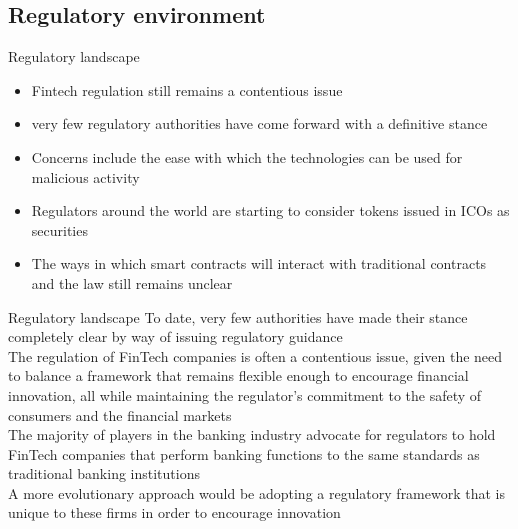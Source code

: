\documentclass[10pt]{beamer}
\begin{document}

\subsection{Regulatory environment}

\begin{frame}{Regulatory landscape}
	\begin{itemize}
		\item Fintech regulation still remains a contentious issue
		\item very few regulatory authorities have come forward with a definitive stance
		\item Concerns include the ease with which the technologies can be used for malicious activity
		\item Regulators around the world are starting to consider tokens issued in ICOs as securities
		\item The ways in which smart contracts will interact with traditional contracts and the law still remains unclear
	\end{itemize}
\end{frame}



\begin{frame}{Regulatory landscape}
	To date, very few authorities have made their stance completely clear by way of issuing regulatory guidance \\ \vspace{3mm}
	The regulation of FinTech companies is often a contentious issue, given the need to balance a framework that remains flexible enough to encourage financial innovation, all while maintaining the regulator's commitment to the safety of consumers and the financial markets  \\ \vspace{3mm}
	The majority of players in the banking industry advocate for regulators to hold FinTech companies that perform banking functions to the same standards as traditional banking institutions \\ \vspace{3mm}
	A more evolutionary approach would be adopting a regulatory framework that is unique to these firms in order to encourage innovation
\end{frame}

\end{document}
